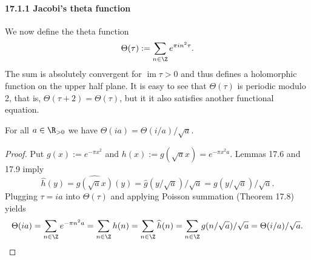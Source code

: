 \paragraph{17.1.1 Jacobi's theta function}
We now define the theta function
\[
\Theta(\tau):=\sum_{n\in\Z}e^{\pi in^2\tau}.
\]
The sum is absolutely convergent for $\operatorname{im}\tau>0$ and thus defines a holomorphic function on the upper half plane. It is easy to see that $\Theta(\tau)$ is periodic modulo 2, that is, $\Theta(\tau+2)=\Theta(\tau)$, but it it also satisfies another functional equation.
\begin{lemma}[17.10]
For all $a\in\R_{>0}$ we have $\Theta(ia)=\Theta(i/a)/\sqrt a$.
\end{lemma}
\begin{proof}
Put $g(x):=e^{-\pi x^2}$ and $h(x):=g(\sqrt a x)=e^{-\pi x^2a}$. Lemmas 17.6 and 17.9 imply
\[
\widehat h(y)=\widehat{g(\sqrt a x)}(y)=\widehat g(y/\sqrt a)/\sqrt a=g(y/\sqrt a)/\sqrt a.
\]
Plugging $\tau=ia$ into $\Theta(\tau)$ and applying Poisson summation (Theorem 17.8) yields
\[
\Theta(ia)=\sum_{n\in\Z}e^{-\pi n^2a}=\sum_{n\in\Z}h(n)
=\sum_{n\in\Z}\widehat h(n)
=\sum_{n\in\Z}g(n/\sqrt a)/\sqrt a=\Theta(i/a)/\sqrt a.
\]
\end{proof}
